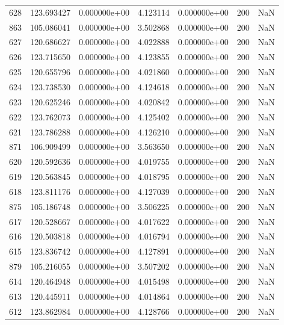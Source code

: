 \begin{tabular}{rrrrrrr}
 628 & 123.693427 &  0.000000e+00 &  4.123114 &  0.000000e+00 &         200 & NaN \\
 863 & 105.086041 &  0.000000e+00 &  3.502868 &  0.000000e+00 &         200 & NaN \\
 627 & 120.686627 &  0.000000e+00 &  4.022888 &  0.000000e+00 &         200 & NaN \\
 626 & 123.715650 &  0.000000e+00 &  4.123855 &  0.000000e+00 &         200 & NaN \\
 625 & 120.655796 &  0.000000e+00 &  4.021860 &  0.000000e+00 &         200 & NaN \\
 624 & 123.738530 &  0.000000e+00 &  4.124618 &  0.000000e+00 &         200 & NaN \\
 623 & 120.625246 &  0.000000e+00 &  4.020842 &  0.000000e+00 &         200 & NaN \\
 622 & 123.762073 &  0.000000e+00 &  4.125402 &  0.000000e+00 &         200 & NaN \\
 621 & 123.786288 &  0.000000e+00 &  4.126210 &  0.000000e+00 &         200 & NaN \\
 871 & 106.909499 &  0.000000e+00 &  3.563650 &  0.000000e+00 &         200 & NaN \\
 620 & 120.592636 &  0.000000e+00 &  4.019755 &  0.000000e+00 &         200 & NaN \\
 619 & 120.563845 &  0.000000e+00 &  4.018795 &  0.000000e+00 &         200 & NaN \\
 618 & 123.811176 &  0.000000e+00 &  4.127039 &  0.000000e+00 &         200 & NaN \\
 875 & 105.186748 &  0.000000e+00 &  3.506225 &  0.000000e+00 &         200 & NaN \\
 617 & 120.528667 &  0.000000e+00 &  4.017622 &  0.000000e+00 &         200 & NaN \\
 616 & 120.503818 &  0.000000e+00 &  4.016794 &  0.000000e+00 &         200 & NaN \\
 615 & 123.836742 &  0.000000e+00 &  4.127891 &  0.000000e+00 &         200 & NaN \\
 879 & 105.216055 &  0.000000e+00 &  3.507202 &  0.000000e+00 &         200 & NaN \\
 614 & 120.464948 &  0.000000e+00 &  4.015498 &  0.000000e+00 &         200 & NaN \\
 613 & 120.445911 &  0.000000e+00 &  4.014864 &  0.000000e+00 &         200 & NaN \\
 612 & 123.862984 &  0.000000e+00 &  4.128766 &  0.000000e+00 &         200 & NaN \\

\end{tabular}

